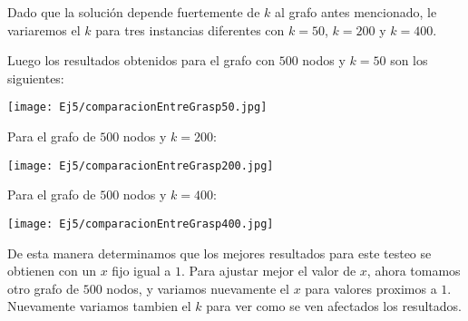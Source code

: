 Dado que la solución depende fuertemente de $k$ al grafo antes mencionado, le variaremos el $k$ para tres instancias diferentes con $k = 50$, $k = 200$ y $k = 400$.

Luego los resultados obtenidos para el grafo con $500$ nodos y $k = 50$ son los siguientes:

\texttt{[image: Ej5/comparacionEntreGrasp50.jpg]}

Para el grafo de $500$ nodos y $k = 200$:

\texttt{[image: Ej5/comparacionEntreGrasp200.jpg]}


Para el grafo de $500$ nodos y $k = 400$:

\texttt{[image: Ej5/comparacionEntreGrasp400.jpg]}

De esta manera determinamos que los mejores resultados para este testeo se obtienen con un $x$ fijo igual a $1$. Para ajustar mejor el valor de $x$, ahora tomamos otro grafo de $500$ nodos, y variamos nuevamente el $x$ para valores proximos a $1$. Nuevamente variamos tambien el $k$ para ver como se ven afectados los resultados.



